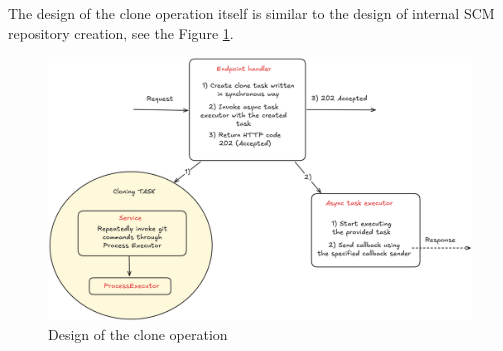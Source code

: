 \documentclass[../main.tex]{subfiles}
\begin{document}
The design of the clone operation itself is similar to the design of internal SCM repository creation, see the Figure \ref{fig:clone-design}.

\begin{figure}
  \begin{center}
    \includegraphics[width=\textwidth]{images/clone-design.png}
  \end{center}
  \caption{Design of the clone operation}
  \label{fig:clone-design}
\end{figure}
\end{document}
